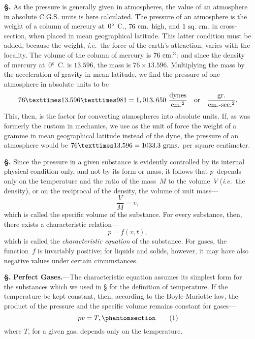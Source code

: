 \documentclass[12pt]{book}[2005/09/16]
\newcommand{\Chg}[2]{#2}
\newcommand{\Section}[1]{
  \medskip\par\textbf{§\;#1}
  \label{section:#1}
}
\newcommand{\SecRef}[2][§\;]{\hyperref[section:#2.]{{\upshape #1#2}}}
\newcommand{\Tag}[1]{%
  \phantomsection\label{eqn:#1}\tag*{\ensuremath{#1}}%
}
\newcommand{\PageSep}[1]{\ignorespaces}
\newcommand{\Topic}[1]{\textbf{#1}}
\newcommand{\ie}{\emph{i.e.}}
\newcommand{\Unit}[1]{\text{\upshape #1}}
\begin{document}
\Section{7.} As the pressure is generally given in atmospheres,
%
the value of an atmosphere in absolute C.G.S. units is here
calculated. The pressure of an atmosphere is the weight
of a column of mercury at~$0°$~C., $76~\Unit{cm.}$ high, and $1~\Unit{sq.}\ \Unit{cm.}$
in cross-section, when placed in mean geographical latitude.
This latter condition must be added, because the weight,
\ie\ the force of the earth's attraction, varies with the locality.
The volume of the column of mercury is $76~\Chg{\Unit{c.c.}}{\Unit{cm.}^{3}}$; and since
the density of mercury at~$0°$~C. is $13.596$, the mass is $76 × 13.596$.
Multiplying the mass by the acceleration of gravity
in mean latitude, we find the pressure of one atmosphere in
absolute units to be
\[
76 × 13.596 × 981 = 1,013,650\ \frac{\Unit{dynes}}{\Unit{cm.}^{2}}
\quad\text{or}\quad \frac{\Unit{gr.}}{\Unit{cm.-sec.}^{2}}.
\]
This, then, is the factor for converting atmospheres into
absolute units. If, as was formerly the custom in mechanics,
we use as the unit of force the weight of a gramme in mean
geographical latitude instead of the dyne, the pressure of
an atmosphere would be $76 × 13.596 = 1033.3~\Unit{grms.}$ per
square centimeter.

\Section{8.} Since the pressure in a given substance is evidently
controlled by its internal physical condition only, and not
by its form or mass, it follows that $p$~depends only on the
temperature and the ratio of the mass~$M$ to the volume~$V$
\PageSep{5}
(\ie\ the density), or on the reciprocal of the density, the
volume of unit mass---
\[
\frac{V}{M} = v,
\]
which is called the specific volume of the substance. For
every substance, then, there exists a characteristic relation---
\[
p = f(v, t),
\]
which is called the \emph{characteristic equation} of the substance.
%
%
For gases, the function~$f$ is invariably positive; for liquids
and solids, however, it may have also negative values under
certain circumstances.

\Section{9.} \Topic{Perfect Gases.}---The characteristic equation assumes
%
%
%
%
%
%
its simplest form for the substances which we used
in \SecRef{4} for the definition of temperature. If the temperature
be kept constant, then, according to the Boyle-Mariotte
law, the product of the pressure and the specific volume
remains constant for gases---
\[
pv = T,
\Tag{(1)}
\]
where $T$, for a given gas, depends only on the temperature.
\end{document}
